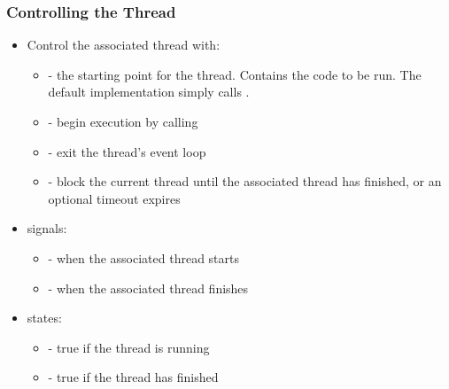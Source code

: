 \begin{slide}
\frametitle{Controlling the Thread}

\begin{itemize}
\item Control the associated thread with:
  \begin{itemize}
  \item \textbf{} - the starting point for the thread.
  Contains the code to be run. The default implementation simply calls .
  \item \textbf{} - begin execution by calling 
  \item \textbf{} - exit the thread's event loop
  \item \textbf{} - block the current thread until the
  associated thread has finished, or an optional timeout expires
  \end{itemize}
\item {} signals:
  \begin{itemize}
  \item \textbf{} - when the associated thread starts
  \item \textbf{} - when the associated thread finishes
  \end{itemize}
\item {} states:
  \begin{itemize}
  \item \textbf{} - true if the thread is running
  \item \textbf{} - true if the thread has finished
  \end{itemize}
\end{itemize}

\end{slide}


